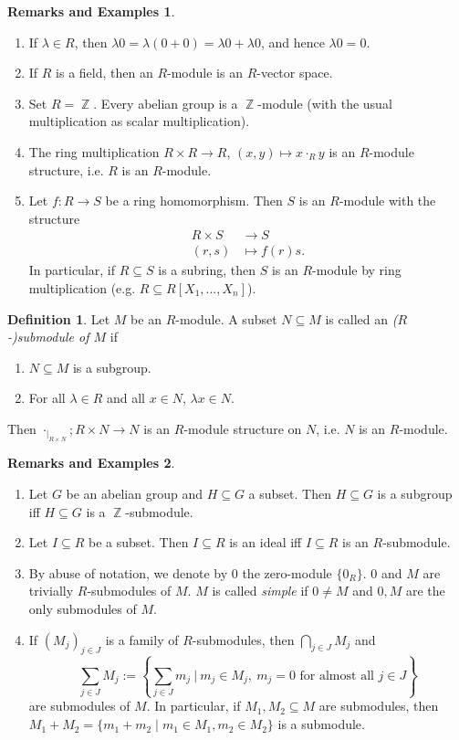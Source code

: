 \documentclass[12pt,a4paper]{report}
\theoremstyle{definition}
\newtheorem{defn}[theorem]{Definition}
\newtheorem*{remex}{Remarks and Examples}
\theoremstyle{num.custom-title}
\DeclareMathOperator{\Z}{\mathbb{Z}}
\DeclareMathOperator{\sse}{\subseteq}
\begin{document}
\begin{remex}\ 
\begin{enumerate}
\item If $\lambda \in R$, then $\lambda 0 = \lambda (0+0) = \lambda 0 + \lambda 0$, and hence $\lambda 0 = 0$.
\item If $R$ is a field, then an $R$-module is an $R$-vector space.
\item Set $R=\Z$. Every abelian group is a $\Z$-module (with the usual multiplication as scalar multiplication).
\item The ring multiplication $R \times R \to R$, $(x,y) \mapsto x \cdot_R y$ is an $R$-module structure, i.e. $R$ is an $R$-module.
\item Let $f: R \to S$ be a ring homomorphism. Then $S$ is an $R$-module with the structure
\begin{align*}
R \times S &\to S \\
(r,s) &\mapsto f(r)s.
\end{align*}
In particular, if $R \sse S$ is a subring, then $S$ is an $R$-module by ring multiplication (e.g. $R \sse R[X_1,...,X_n]$).
\end{enumerate}
\end{remex}

\begin{defn}
Let $M$ be an $R$-module. A subset $N \sse M$ is called an \emph{($R$-)submodule of $M$} if 
\begin{enumerate}
\item $N \sse M$ is a subgroup.
\item For all $\lambda \in R$ and all $x \in N$, $\lambda x \in N$.
\end{enumerate}
Then $\cdot_{|_{R \times N}} ; R \times N \to N$ is an $R$-module structure on $N$, i.e. $N$ is an $R$-module.
\end{defn}

\begin{remex}\ 
\begin{enumerate}
\item Let $G$ be an abelian group and $H \sse G$ a subset. Then $H \sse G$ is a subgroup iff $H \sse G$ is a $\Z$-submodule.
\item Let $I \sse R$ be a subset. Then $I \sse R$ is an ideal iff $I \sse R$ is an $R$-submodule.
\item By abuse of notation, we denote by $0$ the zero-module $\{0_R\}$. $0$ and $M$ are trivially $R$-submodules of $M$. $M$ is called \emph{simple} if $0 \neq M$ and $0,M$ are the only submodules of $M$.
\item If $(M_j)_{j \in J}$ is a family of $R$-submodules, then $\bigcap_{j \in J} M_j$ and
\[
\sum_{j \in J} M_j := \left\{ \sum_{j \in J} m_j \ \Bigg| \ m_j \in M_j, \ m_j = 0 \text{ for almost all } j \in J \right\}
\]
are submodules of $M$. In particular, if $M_1,M_2 \sse M$ are submodules, then $M_1+M_2 = \{m_1 + m_2 \mid m_1 \in M_1, m_2 \in M_2\}$ is a submodule.
\end{enumerate}
\end{remex}
\end{document}
